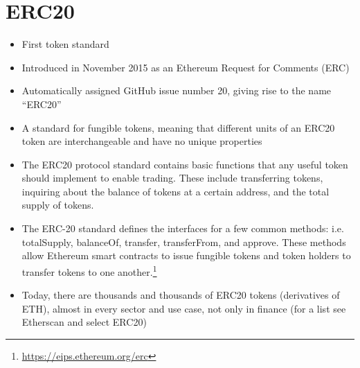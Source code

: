 \section{ERC20}

\begin{itemize}
    \item First token standard
    \item Introduced in November 2015 as an Ethereum Request for Comments (ERC)
    \item Automatically assigned GitHub issue number 20, giving rise to the name ``ERC20''
    \item A standard for fungible tokens, meaning that different units of an ERC20 token are interchangeable and have no unique properties
    \item The ERC20 protocol standard contains basic functions that any useful token should implement to enable trading. These include transferring tokens, inquiring about the balance of tokens at a certain address, and the total supply of tokens.
    \item The ERC-20 standard defines the interfaces for a few common methods: i.e. totalSupply, balanceOf, transfer, transferFrom, and approve. These methods allow Ethereum smart contracts to issue fungible tokens and token holders to transfer tokens to one another.\footnote{\url{https://eips.ethereum.org/erc}}
    \item Today, there are thousands and thousands of ERC20 tokens (derivatives of ETH), almost in every sector and use case, not only in finance (for a list see Etherscan and select ERC20)
\end{itemize}
